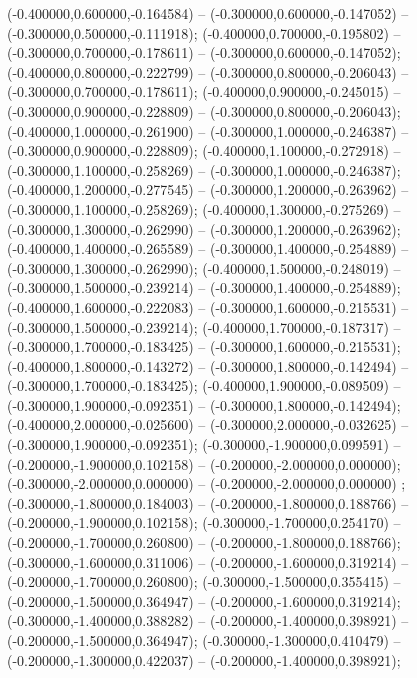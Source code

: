  (-0.400000,0.600000,-0.164584) -- (-0.300000,0.600000,-0.147052) -- (-0.300000,0.500000,-0.111918);
 (-0.400000,0.700000,-0.195802) -- (-0.300000,0.700000,-0.178611) -- (-0.300000,0.600000,-0.147052);
 (-0.400000,0.800000,-0.222799) -- (-0.300000,0.800000,-0.206043) -- (-0.300000,0.700000,-0.178611);
 (-0.400000,0.900000,-0.245015) -- (-0.300000,0.900000,-0.228809) -- (-0.300000,0.800000,-0.206043);
 (-0.400000,1.000000,-0.261900) -- (-0.300000,1.000000,-0.246387) -- (-0.300000,0.900000,-0.228809);
 (-0.400000,1.100000,-0.272918) -- (-0.300000,1.100000,-0.258269) -- (-0.300000,1.000000,-0.246387);
 (-0.400000,1.200000,-0.277545) -- (-0.300000,1.200000,-0.263962) -- (-0.300000,1.100000,-0.258269);
 (-0.400000,1.300000,-0.275269) -- (-0.300000,1.300000,-0.262990) -- (-0.300000,1.200000,-0.263962);
 (-0.400000,1.400000,-0.265589) -- (-0.300000,1.400000,-0.254889) -- (-0.300000,1.300000,-0.262990);
 (-0.400000,1.500000,-0.248019) -- (-0.300000,1.500000,-0.239214) -- (-0.300000,1.400000,-0.254889);
 (-0.400000,1.600000,-0.222083) -- (-0.300000,1.600000,-0.215531) -- (-0.300000,1.500000,-0.239214);
 (-0.400000,1.700000,-0.187317) -- (-0.300000,1.700000,-0.183425) -- (-0.300000,1.600000,-0.215531);
 (-0.400000,1.800000,-0.143272) -- (-0.300000,1.800000,-0.142494) -- (-0.300000,1.700000,-0.183425);
 (-0.400000,1.900000,-0.089509) -- (-0.300000,1.900000,-0.092351) -- (-0.300000,1.800000,-0.142494);
 (-0.400000,2.000000,-0.025600) -- (-0.300000,2.000000,-0.032625) -- (-0.300000,1.900000,-0.092351);
 (-0.300000,-1.900000,0.099591) -- (-0.200000,-1.900000,0.102158) -- (-0.200000,-2.000000,0.000000);
 (-0.300000,-2.000000,0.000000) -- (-0.200000,-2.000000,0.000000) ;
 (-0.300000,-1.800000,0.184003) -- (-0.200000,-1.800000,0.188766) -- (-0.200000,-1.900000,0.102158);
 (-0.300000,-1.700000,0.254170) -- (-0.200000,-1.700000,0.260800) -- (-0.200000,-1.800000,0.188766);
 (-0.300000,-1.600000,0.311006) -- (-0.200000,-1.600000,0.319214) -- (-0.200000,-1.700000,0.260800);
 (-0.300000,-1.500000,0.355415) -- (-0.200000,-1.500000,0.364947) -- (-0.200000,-1.600000,0.319214);
 (-0.300000,-1.400000,0.388282) -- (-0.200000,-1.400000,0.398921) -- (-0.200000,-1.500000,0.364947);
 (-0.300000,-1.300000,0.410479) -- (-0.200000,-1.300000,0.422037) -- (-0.200000,-1.400000,0.398921);
